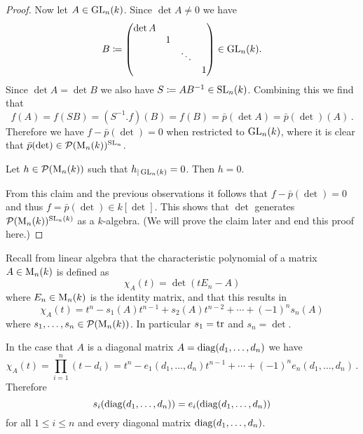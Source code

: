 \begin{proof}
  Now let $A \in \operatorname{GL}_n(k)$.
  Since $\det A \neq 0$ we have
  \[
              B
    \coloneqq \begin{pmatrix}
                \det A &   &        &   \\
                       & 1 &        &   \\
                       &   & \ddots &   \\
                       &   &        & 1 \\
              \end{pmatrix}
    \in       \operatorname{GL}_n(k).
  \]
  Since $\det A = \det B$ we also have $S \coloneqq AB^{-1} \in \operatorname{SL}_n(k)$.
  Combining this we find that
  \[
      f(A)
    = f(SB)
    = \left( S^{-1}.f \right)(B)
    = f(B)
    = \bar{p}(\det A)
    = \bar{p}(\det)(A) \,.
  \]
  Therefore we have $f - \bar{p}(\det) = 0$ when restricted to $\operatorname{GL}_n(k)$, where it is clear that $\bar{p}(\det) \in \mathcal{P}(\operatorname{M}_n(k))^{\operatorname{SL}_n}$.
  
  \begin{claim}
    Let $h \in \mathcal{P}(\operatorname{M}_n(k))$ such that $h_{|\operatorname{GL}_n(k)} = 0$.
    Then $h = 0$.
  \end{claim}
  
  From this claim and the previous observations it follows that $f - \bar{p}(\det) = 0$ and thus $f = \bar{p}(\det) \in k[\det]$.
  This shows that $\det$ generates $\mathcal{P}(\operatorname{M}_n(k))^{\operatorname{SL}_n(k)}$ as a $k$-algebra.
  (We will prove the claim later and end this proof here.)
\end{proof}


Recall from linear algebra that the characteristic polynomial of a matrix $A \in \operatorname{M}_n(k)$ is defined as
\[
    \chi_A(t)
  = \det(t E_n - A)
\]
where $E_n \in \operatorname{M}_n(k)$ is the identity matrix, and that this results in
\[
    \chi_A(t)
  = t^n - s_1(A) t^{n-1} + s_2(A) t^{n-2} + \dotsb + (-1)^n s_n(A)
\]
where $s_1, \dotsc, s_n \in \mathcal{P}(\operatorname{M}_n(k))$.
In particular $s_1 = \operatorname{tr}$ and $s_n = \det$.

In the case that $A$ is a diagonal matrix $A = \operatorname{diag}(d_1, \dotsc, d_n)$ we have
\[
    \chi_A(t)
  = \prod_{i=1}^n (t-d_i)
  = t^n - e_1(d_1, \dotsc, d_n) t^{n-1} + \dotsb + (-1)^n e_n(d_1, \dotsc, d_n) \,.
\]
Therefore
\[
    s_i(\operatorname{diag}(d_1, \dotsc, d_n))
  = e_i(\operatorname{diag}(d_1, \dotsc, d_n))
\]
for all $1 \leq i \leq n$ and every diagonal matrix $\operatorname{diag}(d_1, \dotsc, d_n)$.



